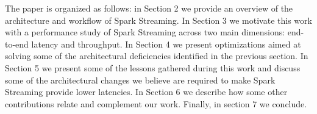 The paper is organized as follows: 
in Section 2 we provide an overview of the architecture and workflow of Spark Streaming. 
In Section 3 we motivate this work with a performance study of Spark Streaming across two main dimensions: end-to-end latency and throughput.
In Section 4 we present optimizations aimed at solving some of the architectural deficiencies identified in the previous section.
In Section 5 we present some of the lessons gathered during this work and discuss some of the architectural changes we believe are required to make Spark Streaming provide lower latencies.
In Section 6 we describe how some other contributions relate and complement our work.
Finally, in section 7 we conclude.

